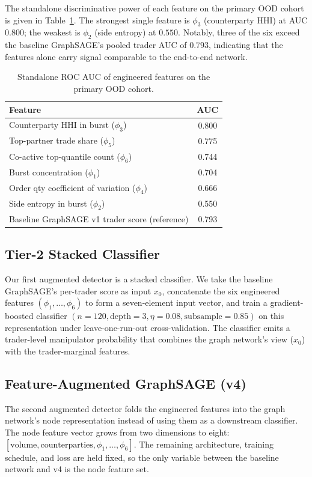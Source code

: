 \documentclass[10pt,twocolumn,letterpaper]{article}
\begin{document}
The standalone discriminative power of each feature on the primary OOD
cohort is given in Table~\ref{tab:standalone}. The strongest single
feature is \(\phi_3\) (counterparty HHI) at AUC \(0.800\); the weakest
is \(\phi_2\) (side entropy) at \(0.550\). Notably, three of the six
exceed the baseline GraphSAGE's pooled trader AUC of \(0.793\),
indicating that the features alone carry signal comparable to the
end-to-end network.

\begin{table}[t]
\caption{Standalone ROC AUC of engineered features on the primary OOD cohort.}
\label{tab:standalone}
\centering
\begin{tabular}{lc}
\toprule
Feature & AUC \\
\midrule
Counterparty HHI in burst ($\phi_3$) & 0.800 \\
Top-partner trade share ($\phi_5$) & 0.775 \\
Co-active top-quantile count ($\phi_6$) & 0.744 \\
Burst concentration ($\phi_1$) & 0.704 \\
Order qty coefficient of variation ($\phi_4$) & 0.666 \\
Side entropy in burst ($\phi_2$) & 0.550 \\
\midrule
Baseline GraphSAGE v1 trader score (reference) & 0.793 \\
\bottomrule
\end{tabular}
\end{table}

\subsection{Tier-2 Stacked Classifier}
\label{sec:tier2}
Our first augmented detector is a stacked classifier. We take the
baseline GraphSAGE's per-trader score as input \(x_0\), concatenate the
six engineered features \((\phi_1,\dots,\phi_6)\) to form a seven-element
input vector, and train a gradient-boosted classifier
\((n=120,\text{depth}{=}3,\eta{=}0.08,\text{subsample}{=}0.85)\) on
this representation under leave-one-run-out cross-validation. The
classifier emits a trader-level manipulator probability that combines
the graph network's view (\(x_0\)) with the trader-marginal features.

\subsection{Feature-Augmented GraphSAGE (v4)}
\label{sec:v4}
The second augmented detector folds the engineered features into the
graph network's node representation instead of using them as a
downstream classifier. The node feature vector grows from two
dimensions to eight: \([\text{volume},\text{counterparties},
\phi_1,\dots,\phi_6]\). The remaining architecture, training schedule,
and loss are held fixed, so the only variable between the baseline
network and v4 is the node feature set.
\end{document}
